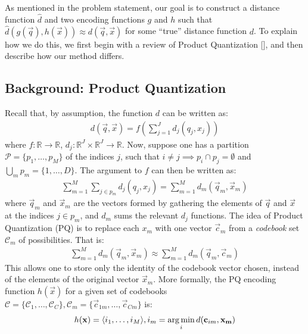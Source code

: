 
As mentioned in the problem statement, our goal is to construct a distance function $\hat{d}$ and two encoding functions $g$ and $h$ such that $\hat{d}(g(\vec{q}), h(\vec{x})) \approx d(\vec{q}, \vec{x})$ for some ``true'' distance function $d$. To explain how we do this, we first begin with a review of Product Quantization [], and then describe how our method differs.

\subsection{Background: Product Quantization}

Recall that, by assumption, the function $d$ can be written as:
\begin{align*}
        d(\vec{q}, \vec{x}) = f(\sum_{j=1}^J d_j(q_j, x_j))
\end{align*}
where $f: \mathbb{R} \rightarrow \mathbb{R}$, $d_j: \mathbb{R}^J \times \mathbb{R}^J \rightarrow \mathbb{R}$. Now, suppose one has a partition $\mathcal{P} = \{p_1,\ldots,p_M \}$ of the indices $j$, such that $i \ne j \implies p_i \cap p_j = \emptyset$ and $\bigcup_m p_m = \{1,\ldots,D\}$. The argument to $f$ can then be written as:
\begin{align}
        \sum_{m=1}^M \sum_{j \in p_m} d_j(q_j, x_j)
            = \sum_{m=1}^M d_m(\vec{q}_m, \vec{x}_m)
\end{align}
where $\vec{q}_m$ and $\vec{x}_m$ are the vectors formed by gathering the elements of $\vec{q}$ and $\vec{x}$ at the indices $j \in p_m$, and $d_m$ sums the relevant $d_j$ functions. The idea of Product Quantization (PQ) is to replace each $x_m$ with one vector $\vec{c}_{m}$ from a \textit{codebook} set $\mathcal{C}_m$ of possibilities. That is: %
\begin{align} \label{eq:pqDistNoLut}
        \sum_{m=1}^M d_m(\vec{q}_m, \vec{x}_m) \approx \sum_{m=1}^M d_m(\vec{q}_m, \vec{c}_{m})
\end{align}
This allows one to store only the identity of the codebook vector chosen, instead of the elements of the original vector $\vec{x}_m$. More formally, the PQ encoding function $h(\vec{x})$ for a given set of codebooks $\mathcal{C} = \{\mathcal{C}_1,\ldots,\mathcal{C}_C\}, \mathcal{C}_m = \{\vec{c}_{1m},\ldots,\vec{c}_{Cm}\}$ is:
\begin{align}
    h(\mathbf{x}) = \langle i_1,\ldots,i_M \rangle,  i_m = \operatorname*{arg\,min}_i d(\mathbf{c}_{im}, \mathbf{x_m})
\end{align}

